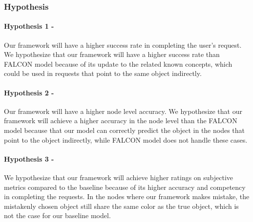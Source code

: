 \subsubsection{Hypothesis}
\paragraph{Hypothesis 1 - } Our framework will have a higher success rate in completing the user's request. We hypothesize that our framework will have a higher success rate than FALCON model because of its update to the related known concepts, which could be used in requests that point to the same object indirectly.
\paragraph{Hypothesis 2 - } Our framework will have a higher node level accuracy. We hypothesize that our framework will achieve a higher accuracy in the node level than the FALCON model because that our model can correctly predict the object in the nodes that point to the object indirectly, while FALCON model does not handle these cases.
\paragraph{Hypothesis 3 - } We hypothesize that our framework will achieve higher ratings on subjective metrics compared to the baseline because of its higher accuracy and competency in completing the requests. In the nodes where our framework makes mistake, the mistakenly chosen object still share the same color as the true object, which is not the case for our baseline model.






